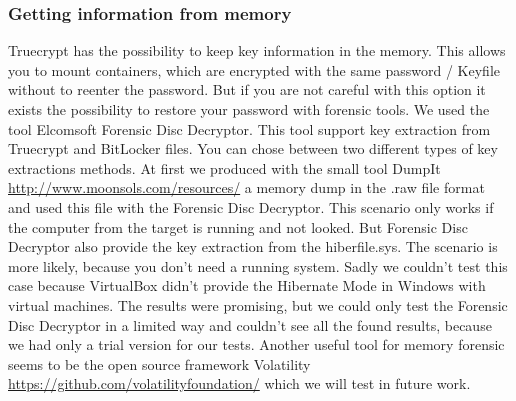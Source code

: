 \subsubsection{Getting information from memory}
Truecrypt has the possibility to keep key information in the memory. This allows you to mount containers, which are encrypted with the same password / Keyfile without to reenter the password. But if you are not careful with this option it exists the possibility to restore your password with forensic tools. We used the tool Elcomsoft Forensic Disc Decryptor.
\cite{elcomsoft:forensicDiskDecrypt} 
This tool support key extraction from Truecrypt and BitLocker files. You can chose between two different types of key extractions methods. At first we produced with the small tool DumpIt \url{http://www.moonsols.com/resources/} a memory dump in the .raw file format and used this file with the Forensic Disc Decryptor.
This scenario only works if the computer from the target is running and not looked. But Forensic Disc Decryptor also provide the key extraction from the hiberfile.sys. The scenario is more likely, because you don't need a running system. Sadly we couldn't test this case because VirtualBox didn't provide the Hibernate Mode in Windows with virtual machines. 
The results were promising, but we could only test the Forensic Disc Decryptor in a limited way and couldn't see all the found results, because we had only a trial version for our tests. Another useful tool for memory forensic seems to be the open source framework Volatility  \url{https://github.com/volatilityfoundation/} which we will test in future work.




